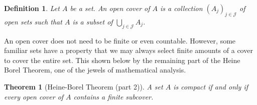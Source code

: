 \documentclass{report}
\newtheorem{theorem}{Theorem}[chapter]
\newtheorem{definition}{Definition}
\begin{document}
\begin{definition}
  Let $A$ be a set. An open cover of $A$ is a collection $(A_j)_{j \in \mathcal{J}}$ of open sets such that $A$ is a subset of $\bigcup_{j \in \mathcal{J}} A_j$.
\end{definition}

An open cover does not need to be finite or even countable. However, some familiar sets have a property that we may always select finite amounts of a cover to cover the entire set. This shown below by the remaining part of the Heine Borel Theorem, one of the jewels of mathematical analysis.

\begin{theorem}[Heine-Borel Theorem (part 2)]
  A set $A$ is compact if and only if every open cover of $A$ contains a finite subcover.
\end{theorem}
\end{document}

